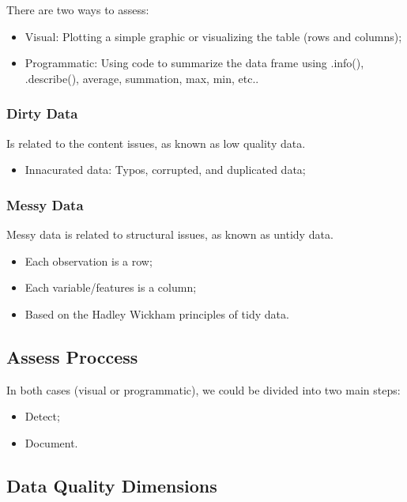 \documentclass[]{book}
\providecommand{\tightlist}{%
  \setlength{\itemsep}{0pt}\setlength{\parskip}{0pt}}
\begin{document}
There are two ways to assess:

\begin{itemize}
\tightlist
\item
  Visual: Plotting a simple graphic or visualizing the table (rows and
  columns);
\item
  Programmatic: Using code to summarize the data frame using .info(),
  .describe(), average, summation, max, min, etc..
\end{itemize}

\subsubsection{Dirty Data}\label{dirty-data}

Is related to the content issues, as known as low quality data.

\begin{itemize}
\tightlist
\item
  Innacurated data: Typos, corrupted, and duplicated data;
\end{itemize}

\subsubsection{Messy Data}\label{messy-data}

Messy data is related to structural issues, as known as untidy data.

\begin{itemize}
\tightlist
\item
  Each observation is a row;
\item
  Each variable/features is a column;
\item
  Based on the Hadley Wickham principles of tidy data.
\end{itemize}

\subsection{Assess Proccess}\label{assess-proccess}

In both cases (visual or programmatic), we could be divided into two
main steps:

\begin{itemize}
\tightlist
\item
  Detect;
\item
  Document.
\end{itemize}

\subsection{Data Quality Dimensions}\label{data-quality-dimensions}
\end{document}
